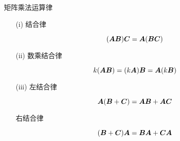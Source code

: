 \begin{frame}
  \begin{footnotesize}
    \begin{block}{矩阵乘法运算律}
      \begin{itemize}
      \item[(i)] 结合律
      \item[] $$ (\A\B)\C = \A(\B\C)$$
      \item[(ii)] 数乘结合律
      \item[] $$ k(\A\B) = (k\A)\B = \A(k\B)$$
      \item[(iii)] 左结合律
      \item[] $$ \A(\B+\C) = \A\B+\A\C$$
      \item[] 右结合律
      \item[] $$ (\B+\C)\A = \B\A+\C\A$$
        
      \end{itemize}
    \end{block}
  \end{footnotesize}
\end{frame}

